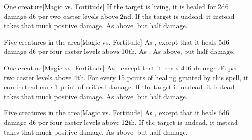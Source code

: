 \spellrng{\rngclose}
\begin{spelltarget}{One creature}[Magic vs. Fortitude]
    \spelleffect If the target is living, it is healed for 2d6 damage \add d6 per two caster levels above 2nd.
    \spellsuccess If the target is undead, it instead takes that much positive damage.
    \spellfailure As above, but half damage.
\end{spelltarget}

\spellrng{\rngclose}
\begin{spelltargets}{Five creatures in the area}[Magic vs. Fortitude]
    \spelleffect As , except that it heals 5d6 damage \add d6 per four caster levels above 10th.
    \spellsuccess As .
    \spellfailure As above, but half damage.
\end{spelltargets}

\spellrng{\rngclose}
\begin{spelltarget}{One creature}[Magic vs. Fortitude]
    \spelleffect As , except that it heals 4d6 damage \add d6 per two caster levels above 4th. For every 15 points of healing granted by this spell, it can instead cure 1 point of critical damage.
    \spellsuccess If the target is undead, it instead takes that much positive damage.
    \spellfailure As above, but half damage.
\end{spelltarget}

\begin{spelltargets}{Five creatures in the area}[Magic vs. Fortitude]
    \spelleffect As , except that it heals 6d6 damage \add d6 per four caster levels above 12th.
    \spellsuccess If the target is undead, it instead takes that much positive damage.
    \spellfailure As above, but half damage.
\end{spelltargets}


